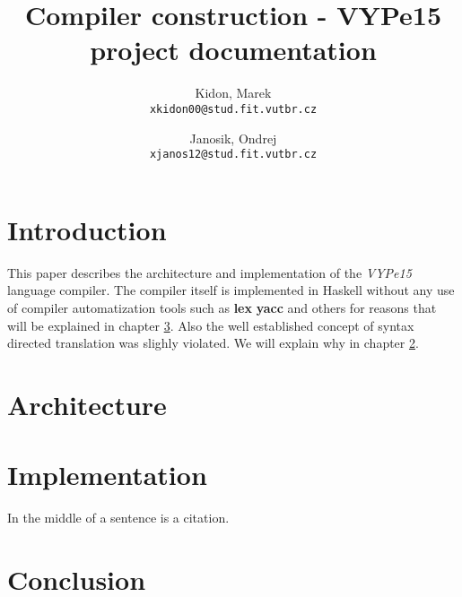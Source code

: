 \documentclass[titlepage]{article}
\title{Compiler construction - VYPe15 project documentation}
\author{
	Kidon, Marek\\
	\texttt{xkidon00@stud.fit.vutbr.cz}
\and 
	Janosik, Ondrej\\
	\texttt{xjanos12@stud.fit.vutbr.cz}
}
\date{}
\begin{document}
\maketitle

\section{Introduction}
This paper describes the architecture and implementation of the \textit{VYPe15} language
compiler. The compiler itself is implemented in Haskell without any use of compiler automatization
tools such as \textbf{lex} \textbf{yacc} and others for reasons that will be explained in chapter 
\ref{sec:implementation}. Also the well established concept of syntax directed translation was slighly violated.
We will explain why in chapter \ref{sec:architecture}.

\section{Architecture}
\label{sec:architecture}

\section{Implementation}
\label{sec:implementation}

In the middle of a sentence is a \cite{ANSIC} citation.

\section{Conclusion}


\end{document}
